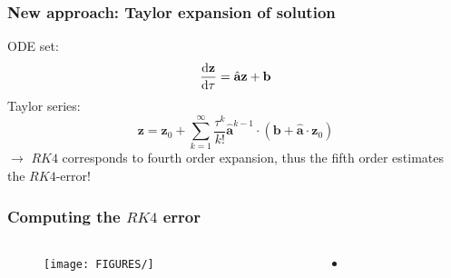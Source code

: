 \documentclass{beamer}
\newcommand{\rd}{{\rm d}}
\begin{document}
\begin{frame}
\frametitle{New approach: Taylor expansion of solution}
\vspace{0cm}
ODE set: $$\frac{\rd \textbf{z}}{\rd \tau} = \hat{\textbf{a}}\textbf{z} + \textbf{b}$$ \newline
\vspace{0cm}
Taylor series: $$\textbf{z}=\textbf{z}_0 + \sum\limits_{k=1}^\infty \frac{\tau^k}{k!}\hat{\textbf{a}}^{k-1}\cdot (\textbf{b} + \hat{ \textbf{a}} \cdot\textbf{z}_0)$$ \newline
$\rightarrow$ $RK4$ corresponds to fourth order expansion, thus the fifth order estimates the $RK4$-error!
\end{frame}

\begin{frame}
\frametitle{Computing the $RK4$ error}
\vspace{0cm}
\begin{columns}[onlytextwidth]
	\begin{column}{0.5\textwidth}
		\begin{center}
			\begin{figure}
				\texttt{[image: FIGURES/]}
				\caption{}
			\end{figure}
		\end{center}
	\end{column}
	\begin{column}{0.5\textwidth}
		\vspace{0cm}
		\begin{center}
			\begin{itemize}
				\item
			\end{itemize}
		\end{center}
	\end{column}
\end{columns}
\end{frame}


\end{document}
